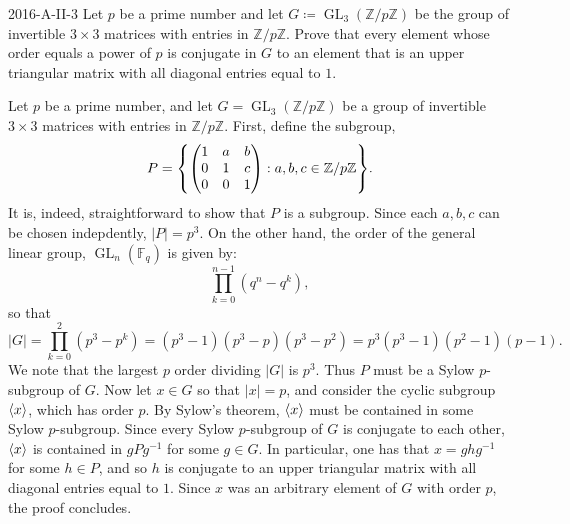 \documentclass{article}
\begin{document}
	\begin{prb}{2016-A-II-3}
		Let $p$ be a prime number and let $G \coloneqq \operatorname{GL}_{3}(\mathbb{Z}/p\mathbb{Z})$ be the group of invertible $3 \times 3$ matrices with entries in $\mathbb{Z}/p\mathbb{Z}$. Prove that every element whose order equals a power of $p$ is conjugate in $G$ to an element that is an upper triangular matrix with all diagonal entries equal to $1$. 
	\end{prb} 
	Let $p$ be a prime number, and let $G = \operatorname{GL}_{3}(\mathbb{Z}/p\mathbb{Z})$ be a group of invertible $3 \times 3$ matrices with entries in $\mathbb{Z}/p\mathbb{Z}$. First, define the subgroup, 
	\begin{equation*}
		P = \brac*{\begin{pmatrix} 1 & a & b \\ 0 & 1 & c \\ 0 & 0 & 1\end{pmatrix} : a, b, c \in \mathbb{Z}/p\mathbb{Z}}. 
	\end{equation*}
	It is, indeed, straightforward to show that $P$ is a subgroup. Since each $a, b, c$ can be chosen indepdently, $|P| = p^{3}$. On the other hand, the order of the general linear group, $\operatorname{GL}_{n}(\mathbb{F}_{q})$ is given by: 
	\begin{equation*}
		\prod_{k = 0}^{n - 1}(q^{n} - q^{k}), 
	\end{equation*}
	so that 
	\begin{equation*}
		|G| =\prod_{k = 0}^{2}(p^{3} - p^{k}) = (p^{3} - 1)(p^{3} - p)(p^{3} - p^{2}) = p^{3}(p^{3} - 1)(p^{2} - 1)(p - 1). 
	\end{equation*}
	We note that the largest $p$ order dividing $|G|$ is $p^{3}$. Thus $P$ must be a Sylow $p$-subgroup of $G$. Now let $x \in G$ so that $|x| = p$, and consider the cyclic subgroup $\braket{x}$, which has order $p$. By Sylow's theorem, $\braket{x}$ must be contained in some Sylow $p$-subgroup. Since every Sylow $p$-subgroup of $G$ is conjugate to each other, $\braket{x}$ is contained in $gPg^{-1}$ for some $g \in G$. In particular, one has that $x = ghg^{-1}$ for some $h \in P$, and so $h$ is conjugate to an upper triangular matrix with all diagonal entries equal to $1$. Since $x$ was an arbitrary element of $G$ with order $p$, the proof concludes. 
	
\end{document}
